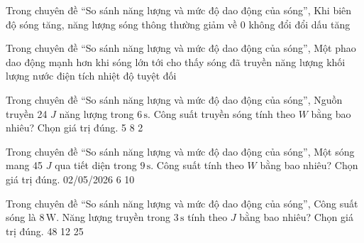 \begin{ex}
Trong chuyên đề “So sánh năng lượng và mức độ dao động của sóng”, Khi biên độ sóng tăng, năng lượng sóng thông thường
\choice
{giảm về 0}
{không đổi}
{đổi dấu}
{\True tăng}
\end{ex}

\begin{ex}
Trong chuyên đề “So sánh năng lượng và mức độ dao động của sóng”, Một phao dao động mạnh hơn khi sóng lớn tới cho thấy sóng đã truyền
\choice
{\True năng lượng}
{khối lượng nước}
{điện tích}
{nhiệt độ tuyệt đối}
\end{ex}

\begin{ex}
Trong chuyên đề “So sánh năng lượng và mức độ dao động của sóng”, Nguồn truyền 24 $J$ năng lượng trong $6\,\text{s}$. Công suất truyền sóng tính theo $W$ bằng bao nhiêu? Chọn giá trị đúng.
\choice
{5}
{}
{8}
{2}
\end{ex}

\begin{ex}
Trong chuyên đề “So sánh năng lượng và mức độ dao động của sóng”, Một sóng mang 45 $J$ qua tiết diện trong $9\,\text{s}$. Công suất tính theo $W$ bằng bao nhiêu? Chọn giá trị đúng.
\choice
{02/05/2026}
{6}
{}
{10}
\end{ex}

\begin{ex}
Trong chuyên đề “So sánh năng lượng và mức độ dao động của sóng”, Công suất sóng là $8\,\text{W}$. Năng lượng truyền trong $3\,\text{s}$ tính theo $J$ bằng bao nhiêu? Chọn giá trị đúng.
\choice
{48}
{12}
{25}
{}
\end{ex}

